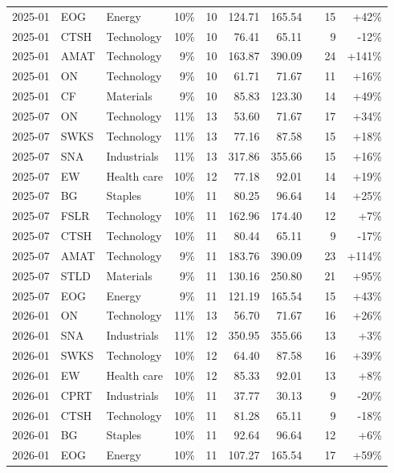 \documentclass[11pt,a4paper]{article}
\begin{document}
{\begin{longtable}{l l l r r r r r r r}
2025-01 & EOG & Energy & 10\% & 10 & 124.71 & 165.54 &  & 15 & +42\% \\
2025-01 & CTSH & Technology & 10\% & 10 & 76.41 & 65.11 &  & 9 & -12\% \\
2025-01 & AMAT & Technology & 9\% & 10 & 163.87 & 390.09 &  & 24 & +141\% \\
2025-01 & ON & Technology & 9\% & 10 & 61.71 & 71.67 &  & 11 & +16\% \\
2025-01 & CF & Materials & 9\% & 10 & 85.83 & 123.30 &  & 14 & +49\% \\
2025-07 & ON & Technology & 11\% & 13 & 53.60 & 71.67 &  & 17 & +34\% \\
2025-07 & SWKS & Technology & 11\% & 13 & 77.16 & 87.58 &  & 15 & +18\% \\
2025-07 & SNA & Industrials & 11\% & 13 & 317.86 & 355.66 &  & 15 & +16\% \\
2025-07 & EW & Health care & 10\% & 12 & 77.18 & 92.01 &  & 14 & +19\% \\
2025-07 & BG & Staples & 10\% & 11 & 80.25 & 96.64 &  & 14 & +25\% \\
2025-07 & FSLR & Technology & 10\% & 11 & 162.96 & 174.40 &  & 12 & +7\% \\
2025-07 & CTSH & Technology & 10\% & 11 & 80.44 & 65.11 &  & 9 & -17\% \\
2025-07 & AMAT & Technology & 9\% & 11 & 183.76 & 390.09 &  & 23 & +114\% \\
2025-07 & STLD & Materials & 9\% & 11 & 130.16 & 250.80 &  & 21 & +95\% \\
2025-07 & EOG & Energy & 9\% & 11 & 121.19 & 165.54 &  & 15 & +43\% \\
2026-01 & ON & Technology & 11\% & 13 & 56.70 & 71.67 &  & 16 & +26\% \\
2026-01 & SNA & Industrials & 11\% & 12 & 350.95 & 355.66 &  & 13 & +3\% \\
2026-01 & SWKS & Technology & 10\% & 12 & 64.40 & 87.58 &  & 16 & +39\% \\
2026-01 & EW & Health care & 10\% & 12 & 85.33 & 92.01 &  & 13 & +8\% \\
2026-01 & CPRT & Industrials & 10\% & 11 & 37.77 & 30.13 &  & 9 & -20\% \\
2026-01 & CTSH & Technology & 10\% & 11 & 81.28 & 65.11 &  & 9 & -18\% \\
2026-01 & BG & Staples & 10\% & 11 & 92.64 & 96.64 &  & 12 & +6\% \\
2026-01 & EOG & Energy & 10\% & 11 & 107.27 & 165.54 &  & 17 & +59\% \\

\end{longtable}}
\end{document}
